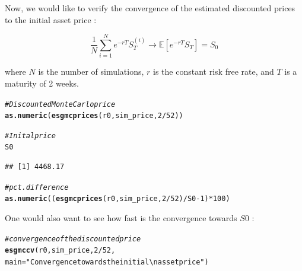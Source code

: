 \documentclass[a4paper]{article}\usepackage[]{graphicx}\usepackage[]{color}
\makeatletter
\newcommand{\hlnum}[1]{\textcolor[rgb]{0.686,0.059,0.569}{#1}}%
\newcommand{\hlstr}[1]{\textcolor[rgb]{0.192,0.494,0.8}{#1}}%
\newcommand{\hlcom}[1]{\textcolor[rgb]{0.678,0.584,0.686}{\textit{#1}}}%
\newcommand{\hlopt}[1]{\textcolor[rgb]{0,0,0}{#1}}%
\newcommand{\hlstd}[1]{\textcolor[rgb]{0.345,0.345,0.345}{#1}}%
\newcommand{\hlkwc}[1]{\textcolor[rgb]{0.333,0.667,0.333}{#1}}%
\newcommand{\hlkwd}[1]{\textcolor[rgb]{0.737,0.353,0.396}{\textbf{#1}}}%
\newenvironment{kframe}{%
 \def\at@end@of@kframe{}%
 \ifinner\ifhmode%
  \def\at@end@of@kframe{\end{minipage}}%
  \begin{minipage}{\columnwidth}%
 \fi\fi%
 \def\FrameCommand##1{\hskip\@totalleftmargin \hskip-\fboxsep
 \colorbox{shadecolor}{##1}\hskip-\fboxsep
     \hskip-\linewidth \hskip-\@totalleftmargin \hskip\columnwidth}%
 \MakeFramed {\advance\hsize-\width
   \@totalleftmargin\z@ \linewidth\hsize
   \@setminipage}}%
 {\par\unskip\endMakeFramed%
 \at@end@of@kframe}
\newenvironment{knitrout}{}{} %
\newcommand{\EE}{\ensuremath{\mathbb{E}} }
\makeatother
\begin{document}
Now, we would like to verify the convergence of the estimated discounted prices to the initial asset price : 

\begin{equation}
\frac{1}{N}\sum_{i = 1}^N e^{-rT} S_T^{(i)} \longrightarrow \EE[e^{-rT}S_T] = S_0
\end{equation}

where $N$ is the number of simulations, $r$ is the constant risk free rate, and $T$ is a maturity of 2 weeks. 

\begin{knitrout}
\color{fgcolor}\begin{kframe}
\begin{alltt}
\hlcom{# Discounted Monte Carlo price}
\hlkwd{as.numeric}\hlstd{(}\hlkwd{esgmcprices}\hlstd{(r0, sim_price,} \hlnum{2}\hlopt{/}\hlnum{52}\hlstd{))}
\end{alltt}


{\ttfamily\noindent\bfseries\color{errorcolor}{\#\# Error in is.ts(X): object 'sim\_price' not found}}\begin{alltt}
\hlcom{# Inital price}
\hlstd{S0}
\end{alltt}
\begin{verbatim}
## [1] 4468.17
\end{verbatim}
\begin{alltt}
\hlcom{# pct. difference}
\hlkwd{as.numeric}\hlstd{((}\hlkwd{esgmcprices}\hlstd{(r0, sim_price,} \hlnum{2}\hlopt{/}\hlnum{52}\hlstd{)}\hlopt{/}\hlstd{S0} \hlopt{-} \hlnum{1}\hlstd{)}\hlopt{*}\hlnum{100}\hlstd{)}
\end{alltt}


{\ttfamily\noindent\bfseries\color{errorcolor}{\#\# Error in is.ts(X): object 'sim\_price' not found}}\end{kframe}
\end{knitrout}

One would also want to see how fast is the convergence towards $S0$ :
\begin{knitrout}
\color{fgcolor}\begin{kframe}
\begin{alltt}
\hlcom{# convergence of the discounted price}
\hlkwd{esgmccv}\hlstd{(r0, sim_price,} \hlnum{2}\hlopt{/}\hlnum{52}\hlstd{,}
        \hlkwc{main} \hlstd{=} \hlstr{"Convergence towards the initial \textbackslash{}n asset price"}\hlstd{)}
\end{alltt}


{\ttfamily\noindent\bfseries\color{errorcolor}{\#\# Error in is.ts(X): object 'sim\_price' not found}}\end{kframe}
\end{knitrout}
\end{document}
